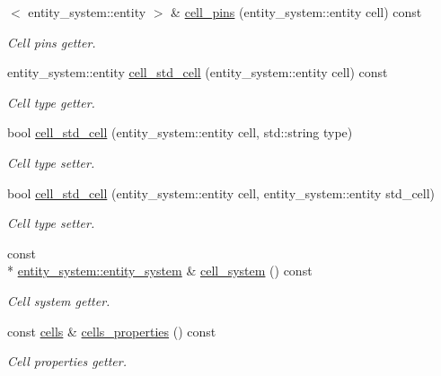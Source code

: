\begin{DoxyCompactItemize}
$<$ entity\-\_\-system\-::entity $>$ \& \hyperlink{classophidian_1_1netlist_1_1netlist_a9da385ea605b5455f2f25877163722f1}{cell\-\_\-pins} (entity\-\_\-system\-::entity cell) const 
\begin{DoxyCompactList}\small\item\em Cell pins getter. \end{DoxyCompactList}\item 
entity\-\_\-system\-::entity \hyperlink{classophidian_1_1netlist_1_1netlist_af25c473076215ca4d7562f238693a2b3}{cell\-\_\-std\-\_\-cell} (entity\-\_\-system\-::entity cell) const 
\begin{DoxyCompactList}\small\item\em Cell type getter. \end{DoxyCompactList}\item 
bool \hyperlink{classophidian_1_1netlist_1_1netlist_a0c914918898d8584aaa8278d90e930b6}{cell\-\_\-std\-\_\-cell} (entity\-\_\-system\-::entity cell, std\-::string type)
\begin{DoxyCompactList}\small\item\em Cell type setter. \end{DoxyCompactList}\item 
bool \hyperlink{classophidian_1_1netlist_1_1netlist_a7b1b7e6884fe8d53b2e52765fdb98e43}{cell\-\_\-std\-\_\-cell} (entity\-\_\-system\-::entity cell, entity\-\_\-system\-::entity std\-\_\-cell)
\begin{DoxyCompactList}\small\item\em Cell type setter. \end{DoxyCompactList}\item 
const \\*
\hyperlink{classophidian_1_1entity__system_1_1entity__system}{entity\-\_\-system\-::entity\-\_\-system} \& \hyperlink{classophidian_1_1netlist_1_1netlist_aa3951a6ecb9dc2895013331d4e8b45f5}{cell\-\_\-system} () const 
\begin{DoxyCompactList}\small\item\em Cell system getter. \end{DoxyCompactList}\item 
const \hyperlink{classophidian_1_1netlist_1_1cells}{cells} \& \hyperlink{classophidian_1_1netlist_1_1netlist_a0e57e192f8dcae8f15531f609274d3e5}{cells\-\_\-properties} () const 
\begin{DoxyCompactList}\small\item\em Cell properties getter. \end{DoxyCompactList}\item 

\end{DoxyCompactItemize}
